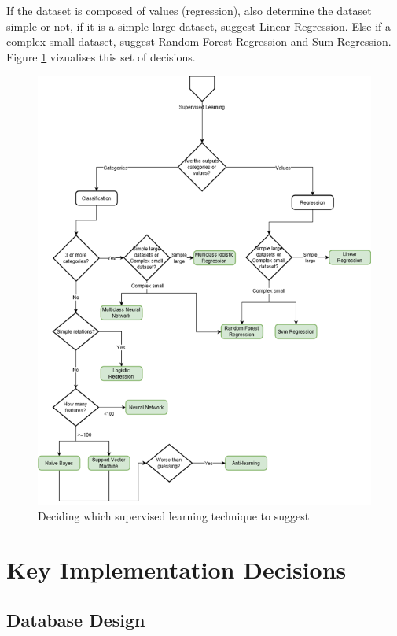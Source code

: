 \documentclass[titlepage]{article}
\begin{document}
If the dataset is composed of values (regression), also determine the dataset simple or not, if it is a simple large dataset, suggest Linear Regression. Else if a complex small dataset, suggest Random Forest Regression and Sum Regression. Figure \ref{supervised-decision} vizualises this set of decisions.

\begin{figure}[h!]
  \centering
  \includegraphics[width=\textwidth]{supervised-decision}
  \caption{Deciding which supervised learning technique to suggest}
  \label{supervised-decision}
\end{figure} \pagebreak

\section{Key Implementation Decisions}
\subsection{Database Design}
\end{document}
